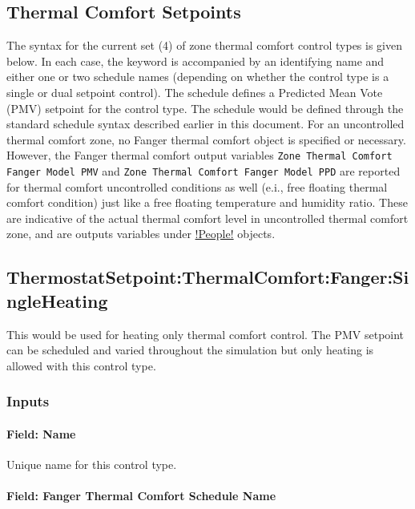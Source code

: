 \subsection{Thermal Comfort Setpoints}\label{thermal-comfort-setpoints}

The syntax for the current set (4) of zone thermal comfort control types is given below. In each case, the keyword is accompanied by an identifying name and either one or two schedule names (depending on whether the control type is a single or dual setpoint control). The schedule defines a Predicted Mean Vote (PMV) setpoint for the control type. The schedule would be defined through the standard schedule syntax described earlier in this document. For an uncontrolled thermal comfort zone, no Fanger thermal comfort object is specified or necessary. However, the Fanger thermal comfort output variables \lstinline!Zone Thermal Comfort Fanger Model PMV! and \lstinline!Zone Thermal Comfort Fanger Model PPD! are reported for thermal comfort uncontrolled conditions as well (e.i., free floating thermal comfort condition) just like a free floating temperature and humidity ratio.   These are indicative of the actual thermal comfort level in uncontrolled thermal comfort zone, and are outputs variables under \hyperref[people]{\listinline!People!} objects.

\subsection{ThermostatSetpoint:ThermalComfort:Fanger:SingleHeating}\label{thermostatsetpointthermalcomfortfangersingleheating}

This would be used for heating only thermal comfort control. The PMV setpoint can be scheduled and varied throughout the simulation but only heating is allowed with this control type.

\subsubsection{Inputs}\label{inputs-10-023}

\paragraph{Field: Name}\label{field-name-8-024}

Unique name for this control type.

\paragraph{Field: Fanger Thermal Comfort Schedule Name}\label{field-fanger-thermal-comfort-schedule-name}

